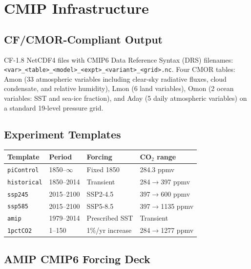 \documentclass[11pt,twoside]{report}
\begin{document}
\chapter{CMIP Infrastructure}
\label{ch:cmip}

\section{CF/CMOR-Compliant Output}

CF-1.8 NetCDF4 files with CMIP6 Data Reference Syntax (DRS) filenames:
\texttt{<var>\_<table>\_<model>\_<expt>\_<variant>\_<grid>.nc}.
Four CMOR tables: Amon (33 atmospheric variables including clear-sky
radiative fluxes, cloud condensate, and relative humidity), Lmon
(6 land variables), Omon (2 ocean variables: SST and sea-ice fraction),
and Aday (5 daily atmospheric variables) on a standard 19-level pressure
grid.

\section{Experiment Templates}

\begin{center}
\begin{tabular}{llll}
\toprule
Template & Period & Forcing & CO$_2$ range \\
\midrule
\texttt{piControl} & 1850--$\infty$ & Fixed 1850 & 284.3 ppmv \\
\texttt{historical} & 1850--2014 & Transient & 284$\to$397 ppmv \\
\texttt{ssp245} & 2015--2100 & SSP2-4.5 & 397$\to$600 ppmv \\
\texttt{ssp585} & 2015--2100 & SSP5-8.5 & 397$\to$1135 ppmv \\
\texttt{amip} & 1979--2014 & Prescribed SST & Transient \\
\texttt{1pctCO2} & 1--150 & 1\%/yr increase & 284$\to$1277 ppmv \\
\bottomrule
\end{tabular}
\end{center}

\section{AMIP CMIP6 Forcing Deck}
\label{sec:amip-cmip6-deck}
\end{document}
